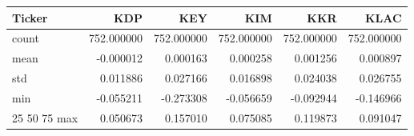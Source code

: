 \begin{tabular}{lrrrrr}
\toprule
Ticker & KDP & KEY & KIM & KKR & KLAC \\
\midrule
count & 752.000000 & 752.000000 & 752.000000 & 752.000000 & 752.000000 \\
mean & -0.000012 & 0.000163 & 0.000258 & 0.001256 & 0.000897 \\
std & 0.011886 & 0.027166 & 0.016898 & 0.024038 & 0.026755 \\
min & -0.055211 & -0.273308 & -0.056659 & -0.092944 & -0.146966 \\
25%
50%
75%
max & 0.050673 & 0.157010 & 0.075085 & 0.119873 & 0.091047 \\
\bottomrule
\end{tabular}
